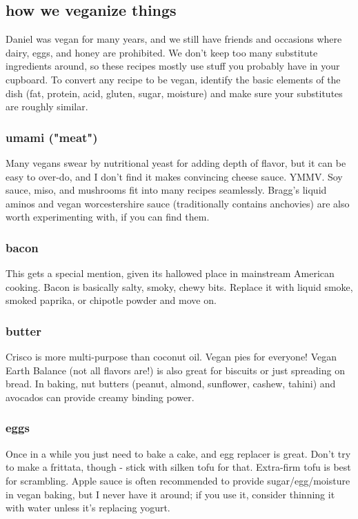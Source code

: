 \subsection{how we veganize things}
Daniel was vegan for many years, and we still have friends and occasions where dairy, eggs, and honey are prohibited. We don't keep too many substitute ingredients around, so these recipes mostly use stuff you probably have in your cupboard. To convert any recipe to be vegan, identify the basic elements of the dish (fat, protein, acid, gluten, sugar, moisture) and make sure your substitutes are roughly similar.

\subsubsection{umami ("meat")}
Many vegans swear by nutritional yeast for adding depth of flavor, but it can be easy to over-do, and I don't find it makes convincing cheese sauce. YMMV. Soy sauce, miso, and mushrooms fit into many recipes seamlessly. Bragg's liquid aminos and vegan worcestershire sauce (traditionally contains anchovies) are also worth experimenting with, if you can find them.

\subsubsection{bacon}
This gets a special mention, given its hallowed place in mainstream American cooking. Bacon is basically salty, smoky, chewy bits. Replace it with liquid smoke, smoked paprika, or chipotle powder and move on.

\subsubsection{butter}
Crisco is more multi-purpose than coconut oil. Vegan pies for everyone! Vegan Earth Balance (not all flavors are!) is also great for biscuits or just spreading on bread. In baking, nut butters (peanut, almond, sunflower, cashew, tahini) and avocados can provide creamy binding power.

\subsubsection{eggs}
Once in a while you just need to bake a cake, and egg replacer is great. Don't try to make a frittata, though - stick with silken tofu for that. Extra-firm tofu is best for scrambling. Apple sauce is often recommended to provide sugar/egg/moisture in vegan baking, but I never have it around; if you use it, consider thinning it with water unless it's replacing yogurt.

